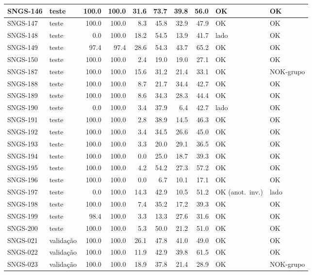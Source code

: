 \begin{small}
\begin{longtable}{|l|l|r|r|r|r|r|r|l|l|}
SNGS-146 & teste & 100.0 & 100.0 & 31.6 & 73.7 & 39.8 & 56.0 & OK & OK \\ \hline
SNGS-147 & teste & 100.0 & 100.0 & 8.3 & 45.8 & 32.9 & 47.9 & OK & OK \\ \hline
SNGS-148 & teste & 0.0 & 100.0 & 18.2 & 54.5 & 13.9 & 41.7 & lado & OK \\ \hline
SNGS-149 & teste & 97.4 & 97.4 & 28.6 & 54.3 & 43.7 & 65.2 & OK & OK \\ \hline
SNGS-150 & teste & 100.0 & 100.0 & 2.4 & 19.0 & 19.0 & 27.1 & OK & OK \\ \hline
SNGS-187 & teste & 100.0 & 100.0 & 15.6 & 31.2 & 21.4 & 33.1 & OK & NOK-grupo \\ \hline
SNGS-188 & teste & 100.0 & 100.0 & 8.7 & 21.7 & 34.4 & 42.7 & OK & OK \\ \hline
SNGS-189 & teste & 100.0 & 100.0 & 8.6 & 34.3 & 28.3 & 44.4 & OK & OK \\ \hline
SNGS-190 & teste & 0.0 & 100.0 & 3.4 & 37.9 & 6.4 & 42.7 & lado & OK \\ \hline
SNGS-191 & teste & 100.0 & 100.0 & 2.8 & 38.9 & 14.5 & 46.3 & OK & OK \\ \hline
SNGS-192 & teste & 100.0 & 100.0 & 3.4 & 34.5 & 26.6 & 45.0 & OK & OK \\ \hline
SNGS-193 & teste & 100.0 & 100.0 & 3.3 & 20.0 & 29.1 & 36.5 & OK & OK \\ \hline
SNGS-194 & teste & 100.0 & 100.0 & 0.0 & 25.0 & 18.7 & 39.3 & OK & OK \\ \hline
SNGS-195 & teste & 100.0 & 100.0 & 4.2 & 54.2 & 27.3 & 57.2 & OK & OK \\ \hline
SNGS-196 & teste & 100.0 & 100.0 & 0.0 & 6.7 & 10.1 & 17.1 & OK & OK \\ \hline
SNGS-197 & teste & 0.0 & 100.0 & 14.3 & 42.9 & 10.5 & 51.2 & OK (anot.\ inv.) & lado \\ \hline
SNGS-198 & teste & 100.0 & 100.0 & 7.4 & 35.2 & 17.2 & 39.3 & OK & OK \\ \hline
SNGS-199 & teste & 98.4 & 100.0 & 3.3 & 13.3 & 27.6 & 31.6 & OK & OK \\ \hline
SNGS-200 & teste & 100.0 & 100.0 & 5.3 & 50.0 & 21.2 & 51.0 & OK & OK \\ \hline
SNGS-021 & validação & 100.0 & 100.0 & 26.1 & 47.8 & 41.0 & 49.0 & OK & OK \\ \hline
SNGS-022 & validação & 100.0 & 100.0 & 11.9 & 42.9 & 39.8 & 61.5 & OK & OK \\ \hline
SNGS-023 & validação & 100.0 & 100.0 & 18.9 & 37.8 & 21.4 & 28.9 & OK & NOK-grupo \\ \hline

\end{longtable}
\end{small}
